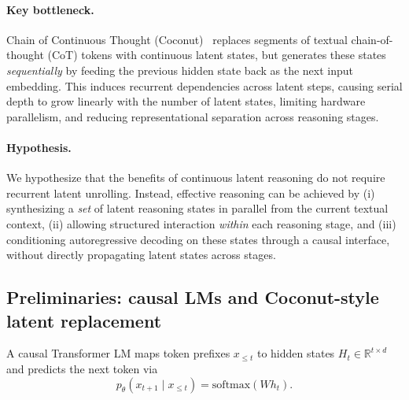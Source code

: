 \paragraph{Key bottleneck.}
Chain of Continuous Thought (Coconut)~\cite{hao2024training} replaces segments of textual chain-of-thought
(CoT) tokens with continuous latent states, but generates these states \emph{sequentially} by feeding the
previous hidden state back as the next input embedding. This induces recurrent dependencies across latent
steps, causing serial depth to grow linearly with the number of latent states, limiting hardware
parallelism, and reducing representational separation across reasoning stages.

\vspace{-3mm}

\paragraph{Hypothesis.}
We hypothesize that the benefits of continuous latent reasoning do not require recurrent latent
unrolling. Instead, effective reasoning can be achieved by (i) synthesizing a \emph{set} of latent
reasoning states in parallel from the current textual context, (ii) allowing structured interaction
\emph{within} each reasoning stage, and (iii) conditioning autoregressive decoding on these states
through a causal interface, without directly propagating latent states across stages.

\subsection{Preliminaries: causal LMs and Coconut-style latent replacement}
\label{sec:prelims}

A causal Transformer LM maps token prefixes $x_{\le t}$ to hidden states
$H_t \in \mathbb{R}^{t \times d}$ and predicts the next token via
\[
p_\theta(x_{t+1}\mid x_{\le t}) = \mathrm{softmax}(W h_t).
\]

